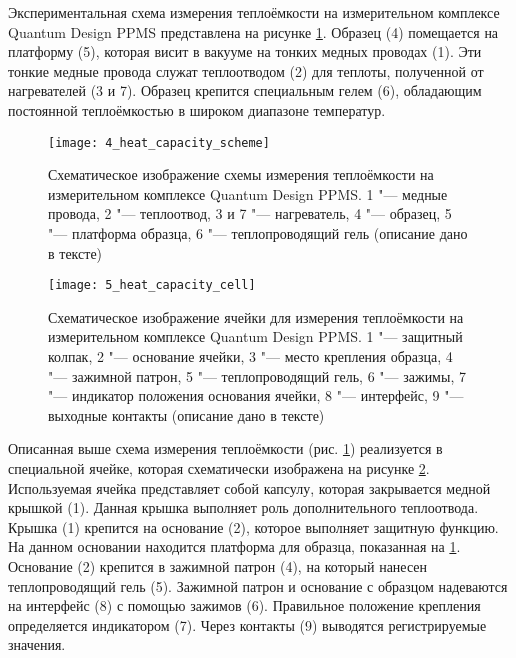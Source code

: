 Экспериментальная схема измерения теплоёмкости на измерительном комплексе Quantum Design PPMS представлена на рисунке \ref{img:figure2}. Образец (4) помещается на платформу (5), которая висит в вакууме на тонких медных проводах (1). Эти тонкие медные провода служат теплоотводом (2) для теплоты, полученной от нагревателей (3 и 7). Образец крепится специальным гелем (6), обладающим постоянной теплоёмкостью в широком диапазоне температур.
\begin{figure}[ht]
  \begin{minipage}[ht]{0.99\linewidth}\centering
    \texttt{[image: 4\_heat\_capacity\_scheme]}
  \end{minipage}
       \caption[Схематическое изображение схемы измерения теплоёмкости на измерительном комплексе Quantum Design PPMS]{Схематическое изображение схемы измерения теплоёмкости на измерительном комплексе Quantum Design PPMS. 1 "--- медные провода, 2 "--- теплоотвод, 3 и 7 "--- нагреватель, 4 "--- образец, 5 "--- платформа образца, 6 "--- теплопроводящий гель (описание дано в тексте)}
    \label{img:figure2}
\end{figure}

\begin{figure}[p!]
  \begin{minipage}[ht]{0.99\linewidth}\centering
    \texttt{[image: 5\_heat\_capacity\_cell]}
  \end{minipage}
       \caption[Схематическое изображение ячейки для измерения теплоёмкости на измерительном комплексе Quantum Design PPMS]{Схематическое изображение ячейки для измерения теплоёмкости на измерительном комплексе Quantum Design PPMS. 1 "--- защитный колпак, 2 "--- основание ячейки, 3 "--- место крепления образца, 4 "--- зажимной патрон, 5 "--- теплопроводящий гель, 6 "--- зажимы, 7 "--- индикатор положения основания ячейки, 8 "--- интерфейс, 9 "--- выходные контакты (описание дано в тексте)}
    \label{img:figure3}
\end{figure}


Описанная выше схема измерения теплоёмкости (рис. \ref{img:figure2}) реализуется в специальной ячейке, которая схематически изображена на рисунке \ref{img:figure3}. Используемая ячейка представляет собой капсулу, которая закрывается медной крышкой (1). Данная крышка выполняет  роль дополнительного теплоотвода. Крышка (1) крепится на основание (2), которое выполняет защитную функцию. На данном основании находится платформа для образца, показанная на \ref{img:figure2}. Основание (2) крепится в зажимной патрон (4), на который нанесен теплопроводящий гель (5). Зажимной патрон и основание с образцом надеваются на интерфейс (8) с помощью зажимов (6). Правильное положение крепления определяется индикатором (7). Через контакты (9) выводятся регистрируемые значения.

